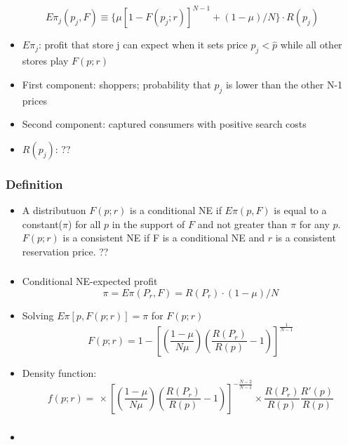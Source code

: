 \documentclass{beamer}
\begin{document}
\begin{frame}
\frametitle{}
$$
E\pi_j(p_j,F)\equiv\{\mu[1-F(p_j;r)]^{N-1}+(1-\mu)/N\}\cdot R(p_j)
$$
\begin{itemize}
	\item $E\pi_j$: profit that store j can expect when it sets price $p_j<\hat{p}$ while all other stores play $F(p;r)$
	\item First component: shoppers; probability that $p_j$ is lower than the other N-1 prices
	\item Second component: captured consumers with positive search costs
	\item $R(p_j)$: ??
\end{itemize} 
\end{frame}

\begin{frame}
\frametitle{Definition}
\begin{itemize}
	\item A distributuon $F(p;r)$ is a conditional NE if $E\pi(p,F)$ is equal to a constant($\pi$) for all $p$ in the support of $F$ and not greater than $\pi$ for any $p$. $F(p;r)$ is a consistent NE if F is a conditional NE and $r$ is a consistent reservation price. ??
\end{itemize}
\end{frame}

\begin{frame}
\frametitle{}
\begin{itemize}
	\item Conditional NE-expected profit
	$$
	\pi = E\pi(P_r,F)=R(P_r)\cdot(1-\mu)/N
	$$
	\item Solving $E\pi[p,F(p;r)]=\pi$ for $F(p;r)$
	$$
	F(p;r)=1-[(\frac{1-\mu}{N\mu})(\frac{R(P_r)}{R(p)}-1)]^{\frac{1}{N-1}}
	$$
	\item Density function:
	$$
	f(p;r) = \frac{}{} \times [(\frac{1-\mu}{N\mu})(\frac{R(P_r)}{R(p)}-1)]^{-\frac{N-2}{N-1}} \times \frac{R(P_r)}{R(p)} \frac{R'(p)}{R(p)}
	$$
\end{itemize}
\end{frame}

\begin{frame}
\frametitle{}
\begin{itemize}
	\item 
\end{itemize}
\end{frame}
\end{document}
